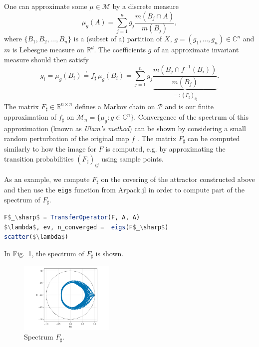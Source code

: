 \documentclass{juliacon}
\newcommand{\R}{{\mathbb R}}
\newcommand{\bbC}{{\mathbb C}}
\newcommand{\cP}{\mathcal{P}}
\newcommand{\cM}{\mathcal{M}}
\begin{document}
One can approximate some $\mu\in\cM$ by a discrete measure 
\begin{equation}
    \mu_g(A) = \sum_{j=1}^{n} g_j \frac{m(B_j \cap A)}{m(B_j)}, 
\end{equation}
where $\{ B_1, B_2, \ldots, B_n\}$ is a (subset of a) partition of $X$, $g=(g_1,\ldots,g_n)\in\bbC^n$ and $m$ is Lebesgue measure on $\R^d$. The coefficients $g$ of an approximate invariant measure should then satisfy
\begin{equation}
    g_i = \mu_g (B_i) \overset{!}{=} f_\sharp\, \mu_g (B_i) = 
    \sum_{j=1}^{n} g_j
    \underbrace{\frac{m(B_j \cap f^{-1} (B_i))}{m(B_j)}}_{
    =: \left( F_\sharp \right)_{ij}
    }. 
\end{equation}
The matrix $F_\sharp\in\R^{n\times n}$ defines a Markov chain on $\cP$ and is our finite approximation of $f_\sharp$ on $\cM_n=\{\mu_g:g\in\bbC^n\}$. Convergence of the spectrum of this approximation (known as \emph{Ulam's method}) can be shown by considering a small random perturbation of the original map $f$ \cite{DeJu:99}.  The matrix $F_\sharp$ can be computed similarly to how the image for $F$ is computed, e.g. by approximating the transition probabilities $(F_\sharp)_{ij}$ using sample points.


As an example, we compute $F_\sharp$ on the covering of the attractor constructed  above and then use the \texttt{eigs} function from Arpack.jl in order to compute part of the spectrum of $F_\sharp$. 
\begin{lstlisting}[language=Julia,mathescape,backgroundcolor=\color{gray10}]
F$_\sharp$ = TransferOperator(F, A, A)
$\lambda$, ev, n_converged =  eigs(F$_\sharp$)
scatter($\lambda$)
\end{lstlisting}

In Fig.~\ref{fig:spectrum}, the spectrum of $F_\sharp$ is shown. 
\begin{figure}[h]
    \centering
    \includegraphics[width=0.4\textwidth]{spectrum.pdf}
    \caption{Spectrum $F_\sharp$.}
    \label{fig:spectrum}
\end{figure}
\end{document}

